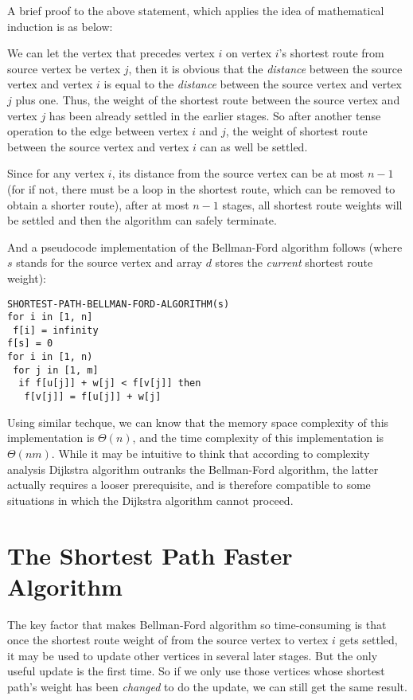 \documentclass[a4paper,11pt,twocolumn]{article}
\begin{document}
A brief proof to the above statement, which applies the idea of mathematical induction is as below:

We can let the vertex that precedes vertex $i$ on vertex $i$'s shortest route from source vertex be vertex $j$, then it is obvious that the \emph{distance} between the source vertex and vertex $i$ is equal to the \emph{distance} between the source vertex and vertex $j$ plus one. Thus, the weight of the shortest route between the source vertex and vertex $j$ has been already settled in the earlier stages. So after another tense operation to the edge between vertex $i$ and $j$, the weight of shortest route between the source vertex and vertex $i$ can as well be settled.

Since for any vertex $i$, its distance from the source vertex can be at most $n - 1$ (for if not, there must be a loop in the shortest route, which can be removed to obtain a shorter route), after at most $n - 1$ stages, all shortest route weights will be settled and then the algorithm can safely terminate.

And a pseudocode implementation of the Bellman-Ford algorithm follows (where $s$ stands for the source vertex and array $d$ stores the \emph{current} shortest route weight):

\begin{verbatim}
SHORTEST-PATH-BELLMAN-FORD-ALGORITHM(s)
for i in [1, n]
 f[i] = infinity
f[s] = 0
for i in [1, n)
 for j in [1, m]
  if f[u[j]] + w[j] < f[v[j]] then
   f[v[j]] = f[u[j]] + w[j]
\end{verbatim}

Using similar techque, we can know that the memory space complexity of this implementation is $\Theta(n)$, and the time complexity of this implementation is $\Theta(nm)$. While it may be intuitive to think that according to complexity analysis Dijkstra algorithm outranks the Bellman-Ford algorithm, the latter actually requires a looser prerequisite, and is therefore compatible to some situations in which the Dijkstra algorithm cannot proceed.

\section{The Shortest Path Faster Algorithm}

The key factor that makes Bellman-Ford algorithm so time-consuming is that once the shortest route weight of from the source vertex to vertex $i$ gets settled, it may be used to update other vertices in several later stages. But the only useful update is the first time. So if we only use those vertices whose shortest path's weight has been \emph{changed} to do the update, we can still get the same result.
\end{document}
